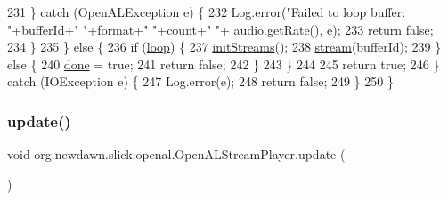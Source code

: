 \begin{DoxyCode}
231                 \} \textcolor{keywordflow}{catch} (OpenALException e) \{
232                     Log.error(\textcolor{stringliteral}{"Failed to loop buffer: "}+bufferId+\textcolor{stringliteral}{" "}+format+\textcolor{stringliteral}{" "}+count+\textcolor{stringliteral}{" "}+
      \mbox{\hyperlink{classorg_1_1newdawn_1_1slick_1_1openal_1_1_open_a_l_stream_player_a694870dca2079ff6e6269a394a126d17}{audio}}.\mbox{\hyperlink{interfaceorg_1_1newdawn_1_1slick_1_1openal_1_1_audio_input_stream_a461c4ad4304ff8d75693c93e525e0f85}{getRate}}(), e);
233                     \textcolor{keywordflow}{return} \textcolor{keyword}{false};
234                 \}
235             \} \textcolor{keywordflow}{else} \{
236                 \textcolor{keywordflow}{if} (\mbox{\hyperlink{classorg_1_1newdawn_1_1slick_1_1openal_1_1_open_a_l_stream_player_a377b3e28ef63fca0134898a07b086e7f}{loop}}) \{
237                     \mbox{\hyperlink{classorg_1_1newdawn_1_1slick_1_1openal_1_1_open_a_l_stream_player_a765f3c95de540350a0ed4902a6d9792a}{initStreams}}();
238                     \mbox{\hyperlink{classorg_1_1newdawn_1_1slick_1_1openal_1_1_open_a_l_stream_player_a2facc6d1dcd937dbdc5dadcbb81929ed}{stream}}(bufferId);
239                 \} \textcolor{keywordflow}{else} \{
240                     \mbox{\hyperlink{classorg_1_1newdawn_1_1slick_1_1openal_1_1_open_a_l_stream_player_a64962f56b4c366c19fe3c2bff2f55842}{done}} = \textcolor{keyword}{true};
241                     \textcolor{keywordflow}{return} \textcolor{keyword}{false};
242                 \}
243             \}
244             
245             \textcolor{keywordflow}{return} \textcolor{keyword}{true};
246         \} \textcolor{keywordflow}{catch} (IOException e) \{
247             Log.error(e);
248             \textcolor{keywordflow}{return} \textcolor{keyword}{false};
249         \}
250     \}
\end{DoxyCode}
\mbox{\label{classorg_1_1newdawn_1_1slick_1_1openal_1_1_open_a_l_stream_player_af92a75dd6caa02680b7520511137ae8d}} 
\subsubsection{\texorpdfstring{update()}{update()}}
{\footnotesize\ttfamily void org.\+newdawn.\+slick.\+openal.\+Open\+A\+L\+Stream\+Player.\+update (\begin{DoxyParamCaption}{ }\end{DoxyParamCaption})\hspace{0.3cm}{\ttfamily [inline]}}

